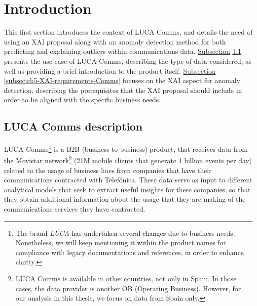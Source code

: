 \section{Introduction}\label{sec:ch5-IntroComms}
This first section introduces the context of LUCA Comms, and details the need of using an XAI proposal along with an anomaly detection method for both predicting and explaining outliers within communications data. \hyperref[subsec:ch5-DescriptionComms]{Subsection} \ref{subsec:ch5-DescriptionComms} presents the use case of LUCA Comms, describing the type of data considered, as well as providing a brief introduction to the product itself. \hyperref[subsec:ch5-XAI-requirements-Comms]{Subsection} \ref{subsec:ch5-XAI-requirements-Comms} focuses on the XAI aspect for anomaly detection, describing the prerequisites that the XAI proposal should include in order to be aligned with the specific business needs.


\subsection{LUCA Comms description}\label{subsec:ch5-DescriptionComms}
LUCA Comms\footnote{The brand \textit{LUCA} has undertaken several changes due to business needs. Nonetheless, we will keep mentioning it within the product names for compliance with legacy documentations and references, in order to enhance clarity.} is a B2B (business to business) product, that receives data from the Movistar network\footnote{LUCA Comms is available in other countries, not only in Spain. In those cases, the data provider is another OB (Operating Business). However, for our analysis in this thesis, we focus on data from Spain only.} (21M mobile clients that generate 1 billion events per day) related to the usage of business lines from companies that have their communications contracted with Telefónica. These data serve as input to different analytical models that seek to extract useful insights for these companies, so that they obtain additional information about the usage that they are making of the communications services they have contracted. 

